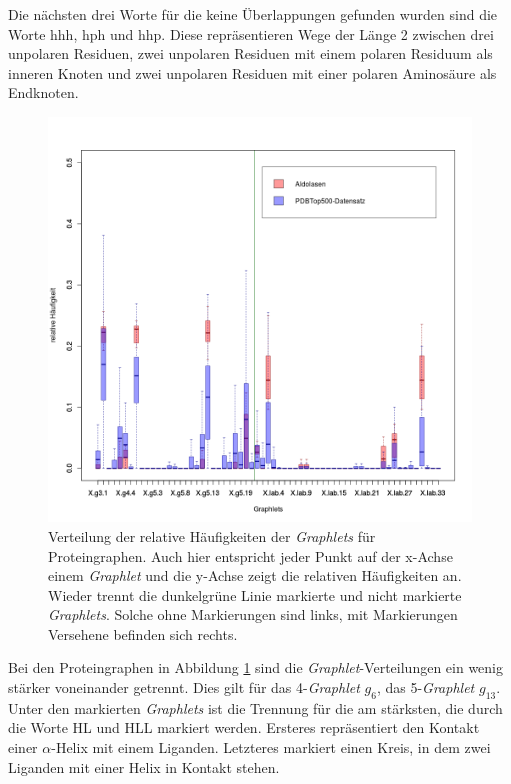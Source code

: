 \documentclass{report}
\begin{document}
Die n\"achsten drei Worte f\"ur die keine \"Uberlappungen gefunden wurden sind die Worte hhh, hph und hhp. Diese repr\"asentieren Wege der L\"ange 2 zwischen drei unpolaren Residuen, zwei unpolaren Residuen mit einem polaren Residuum als inneren Knoten und zwei unpolaren Residuen mit einer polaren Aminos\"aure als Endknoten.


\begin{figure}
\label{fig:pgplot}
\includegraphics[scale=0.55]{pg_plot.png}
\caption{Verteilung der relative H\"aufigkeiten der \textit{Graphlets} f\"ur Proteingraphen. Auch hier entspricht jeder Punkt auf der x-Achse einem \textit{Graphlet} und die y-Achse zeigt die relativen H\"aufigkeiten an. Wieder trennt die dunkelgr\"une Linie markierte und nicht markierte \textit{Graphlets}. Solche ohne Markierungen sind links, mit Markierungen Versehene befinden sich rechts.}
\end{figure}

Bei den Proteingraphen in Abbildung \ref{fig:pgplot} sind die \textit{Graphlet}-Verteilungen ein wenig st\"arker voneinander getrennt.  
Dies gilt f\"ur das 4-\textit{Graphlet} $g_6$, das 5-\textit{Graphlet} $g_13$. Unter den markierten \textit{Graphlets} ist die Trennung f\"ur die am st\"arksten, die durch die Worte HL und HLL markiert werden. Ersteres repr\"asentiert den Kontakt einer $\alpha$-Helix mit einem Liganden. Letzteres markiert einen Kreis, in dem zwei Liganden mit einer Helix in Kontakt stehen.
\end{document}
